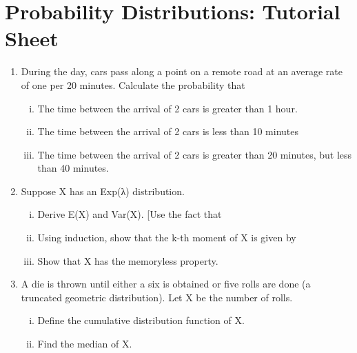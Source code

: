 \documentclass[]{report}
\begin{document}
\section{Probability Distributions: 	Tutorial Sheet }
	\begin{enumerate}	
		\item During the day, cars pass along a point on a remote road at an average rate of one per 20 minutes. Calculate the probability that 
		\begin{enumerate}[(i)]
			\item 		The time between the arrival of 2 cars is greater than 1 hour.
		\item The time between the arrival of 2 cars is less than 10 minutes 
		\item	The time between the arrival of 2 cars is greater than 20 minutes, but less than 40 minutes. 
			
		\end{enumerate}

		\item 	Suppose X has an Exp(λ) distribution.
		\begin{enumerate}[(i)]
			\item 	Derive E(X) and Var(X). [Use the fact that 
			\item 	Using induction, show that the k-th moment of X is given by %
			\item 	      Show that X has the memoryless property.
			\end{enumerate}
		
		
		\item	A die is thrown until either a six is obtained or five rolls are done (a truncated geometric distribution). Let X be the number of rolls.
			\begin{enumerate}[(i)]
				\item 		Define the cumulative distribution function of X.
		\item 	Find the median of X.
	\end{enumerate}
		
		
		
	\end{enumerate}	
	
\end{document}

